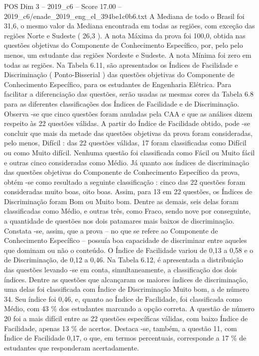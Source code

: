 \begin{textsample}{POS Dim 3 – 2019\_c6 – Score 17.00 – 2019\_c6/enade\_2019\_eng\_el\_394be1c0b6.txt}
A Mediana de todo o Brasil foi 31,6, o mesmo valor da Mediana encontrada em todas as regiões, com exceção das regiões Norte e Sudeste ( 26,3 ).
A nota Máxima da prova foi 100,0, obtida nas questões objetivas do Componente de Conhecimento Específico, por, pelo pelo menos, um estudante das regiões Nordeste e Sudeste.
A nota Mínima foi zero em todas as regiões.
Na Tabela 6.11, são apresentados os Índices de Facilidade e Discriminação ( Ponto-Bisserial ) das questões objetivas do Componente de Conhecimento Específico, para os estudantes de Engenharia Elétrica.
Para facilitar a diferenciação das questões, serão usadas as mesmas cores da Tabela 6.8 para as diferentes classificações dos Índices de Facilidade e de Discriminação.
Observa -se que cinco questões foram anuladas pela CAA e que as análises dizem respeito às 22 questões válidas.
A partir do Índice de Facilidade obtido, pode -se concluir que mais da metade das questões objetivas da prova foram consideradas, pelo menos, Difícil : das 22 questões válidas, 17 foram classificadas como Difícil ou como Muito difícil.
Nenhuma questão foi classificada como Fácil ou Muito fácil e outras cinco consideradas como Médio.
Já quanto aos índices de discriminação das questões objetivas do Componente de Conhecimento Específico da prova, obtém -se como resultado a seguinte classificação : cinco das 22 questões foram consideradas muito boas, oito boas.
Assim, para 13 em 22 questões, os Índices de Discriminação foram Bom ou Muito bom.
Dentre as demais, seis delas foram classificadas como Médio, e outras três, como Fraco, sendo nove por conseguinte, a quantidade de questões nos dois patamares mais baixos de discriminação.
Constata -se, assim, que a prova – no que se refere ao Componente de Conhecimento Específico – possuía boa capacidade de discriminar entre aqueles que dominam ou não o conteúdo.
O Índice de Facilidade variou de 0,13 a 0,58 e o de Discriminação, de 0,12 a 0,46.
Na Tabela 6.12, é apresentada a distribuição das questões levando -se em conta, simultaneamente, a classificação dos dois índices.
Dentre as questões que alcançaram os maiores índices de discriminação, uma delas foi classificada com Índice de Discriminação Muito bom, a de número 34.
Seu índice foi 0,46, e, quanto ao Índice de Facilidade, foi classificada como Médio, com 43 \% dos estudantes marcando a opção correta.
A questão de número 20 foi a mais difícil entre as 22 questões específicas válidas, com baixo Índice de Facilidade, apenas 13 \% de acertos.
Destaca -se, também, a questão 11, com Índice de Facilidade 0,17, o que, em termos percentuais, corresponde a 17 \% de estudantes que responderam acertadamente.

\end{textsample}

